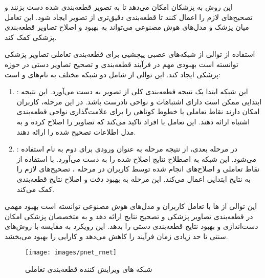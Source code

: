 این روش به پزشکان امکان می‌دهد تا به تصویر قطعه‌بندی شده دست بزنند و تصحیح‌های لازم را اعمال کنند تا قطعه‌بندی دقیق‌تری از تصویر ایجاد شود. این تعامل میان پزشک و مدل‌های هوش مصنوعی می‌تواند به بهبود و اصلاح تصاویر قطعه‌بندی پزشکی کمک کند.

استفاده از توالی از شبکه‌های عصبی پیچشیی برای قطعه‌بندی تعاملی تصاویر پزشکی توانسته است بهبودی مهم در فرآیند قطعه‌بندی و تصحیح تصاویر دستی در حوزه پزشکی ایجاد کند. این توالی از  شامل دو شبکه مختلف به نام‌های  و  است:

\begin{enumerate}
    \item {}: این شبکه ابتدا یک نتیجه قطعه‌بندی کلی از تصویر به دست می‌آورد. این نتیجه ابتدایی ممکن است دارای اشتباهات و نواحی نادرست باشد. در این مرحله، کاربران امکان دارند نقاط تعاملی یا خطوط کوتاهی را برای علامت‌گذاری نواحی قطعه‌بندی اشتباه ارائه دهند. این تعامل با افراد تاکید می‌کند که تصاویر را اصلاح کرده و به مدل اطلاعات تصحیح شده را ارائه دهند.
    \item {}: در مرحله بعدی، از نتیجه مرحله  به عنوان ورودی برای  دوم به نام  استفاده می‌شود. این شبکه به اصطلاح نتایج اصلاح شده را به دست می‌آورد. با استفاده از نقاط تعاملی و اصلاح‌های انجام شده توسط کاربران در مرحله ،  تصحیح‌های لازم را به نتایج ابتدایی اعمال می‌کند. این مرحله به بهبود دقت و اصلاح نتایج قطعه‌بندی کمک می‌کند.
\end{enumerate}

این توالی از ‌ها با تعامل کاربران و مدل‌های هوش مصنوعی توانسته است بهبود مهمی در قطعه‌بندی تصاویر پزشکی و تصحیح نتایج ارائه دهد و به متخصصان پزشکی امکان دست‌اندازی و بهبود نتایج قطعه‌بندی دستی را بدهد. این رویکرد به مقایسه با روش‌های سنتی تا حد زیادی زمان فرآیند را کاهش می‌دهد و کارایی را بهبود می‌بخشد\cite{wang2022medical}.

\begin{figure}[h]
\centerline{\texttt{[image: images/pnet\_rnet]}}
\caption[\hspace{0.5em}شبکه های ویرایش کننده قطعه‌بندی تعاملی]{شبکه های ویرایش کننده قطعه‌بندی تعاملی\cite{wang2022medical}}
\label{fig:pnet_rnet}
\end{figure}

